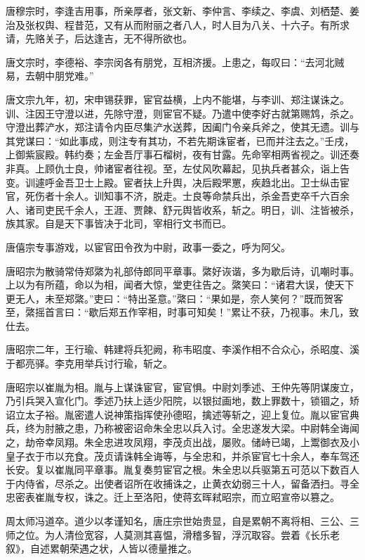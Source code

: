 \documentclass[a4paper,12pt,UTF8,twoside]{ctexbook}
\begin{document}
    唐穆宗时，李逢吉用事，所亲厚者，张文新、李仲言、李续之、李虞、刘栖楚、姜治及张权舆、程昔范，又有从而附丽之者八人，时人目为八关、十六子。有所求请，先赂关子，后达逢吉，无不得所欲也。
    
    唐文宗时，李德裕、李宗闵各有朋党，互相济援。上患之，每叹曰：“去河北贼易，去朝中朋党难。”
    
    唐文宗九年，初，宋申锡获罪，宦官益横，上内不能堪，与李训、郑注谋诛之。训、注因王守澄以进，先除守澄，则宦官不疑。乃遣中使李好古就第赐鸩，杀之。守澄出葬浐水，郑注请令内臣尽集浐水送葬，因阖门令亲兵斧之，使其无遗。训与其党谋曰：“如此事成，则注专有其功，不若先期诛宦者，已而并注去之。”壬戌，上御紫宸殿。韩约奏；左金吾厅事石榴树，夜有甘露。先命宰相两省视之。训还奏非真。上顾仇士良，帅诸宦者往视。至，左仗风吹幕起，见执兵者甚众，诣上告变。训遽呼金吾卫士上殿。宦者扶上升舆，决后殿罘罳，疾趋北出。卫士纵击宦官，死伤者十余人。训知事不济，脱走。士良等命禁兵出，杀金吾吏卒千六百余人、诸司吏民千余人，王涯、贾餗、舒元舆皆收系，斩之。明日，训、注皆被杀，族其家。自是天下事皆决于北司，宰相行文书而已。
    
    唐僖宗专事游戏，以宦官田令孜为中尉，政事一委之，呼为阿父。
    
    唐昭宗为散骑常侍郑綮为礼部侍郎同平章事。綮好诙谐，多为歇后诗，讥嘲时事。上以为有所蕴，命以为相，闻者大惊，堂吏往告之。綮笑曰：“诸君大误，使天下更无人，未至郑綮。”吏曰：“特出圣意。”綮曰：“果如是，奈人笑何？”既而贺客至，綮摇首言曰：“歇后郑五作宰相，时事可知矣！”累让不获，乃视事。未几，致仕去。
    
    唐昭宗二年，王行瑜、韩建将兵犯阙，称韦昭度、李溪作相不合众心，杀昭度、溪于都亮驿。李克用举兵讨行瑜，斩之。
    
    唐昭宗以崔胤为相。胤与上谋诛宦官，宦官惧。中尉刘季述、王仲先等阴谋废立，乃引兵哭入宣化门。季述乃扶上适少阳院，以银挝画地，数上罪数十，锁锢之，矫诏立太子裕。胤密遣人说神策指挥使孙德昭，擒述等斩之，迎上复位。胤以宦官典兵，终为肘腋之患，乃称被密诏命朱全忠以兵入讨。全忠遂发大梁。中尉韩全诲闻之，劫帝幸凤翔。朱全忠进攻凤翔，李茂贞出战，屡败。储峙已竭，上鬻御衣及小皇子衣于市以充食。茂贞请诛韩全诲等，与全忠和，并杀宦官七十余人，奉车驾还长安。复以崔胤同平章事。胤复奏剪宦官之根。朱全忠以兵驱第五可范以下数百人于内侍省，尽杀之。出使者诏所在收捕诛之，止黄衣幼弱三十人，留备洒扫。寻全忠密表崔胤专权，诛之。迁上至洛阳，使蒋玄晖弒昭宗，而立昭宣帝以篡之。
    
    周太师冯道卒。道少以孝谨知名，唐庄宗世始贵显，自是累朝不离将相、三公、三师之位。为人清俭宽容，人莫测其喜愠，滑稽多智，浮沉取容。尝着《长乐老叙》，自述累朝荣遇之状，人皆以德量推之。
    
\end{document}
